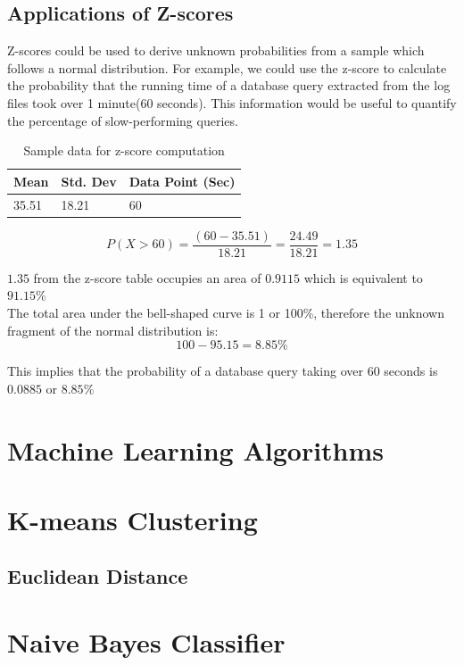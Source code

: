 \documentclass[12pt, letterpaper, titlepage]{report}
\begin{document}
\subsection{Applications of Z-scores}
Z-scores could be used to derive unknown probabilities from a sample which follows a normal distribution.
For example, we could use the z-score to calculate the probability that the running time of a database query extracted from the log files took over 1 minute(60 seconds). This information would be useful to quantify the percentage of slow-performing queries. \\
\begin{table}[h!]
	\centering
	
	
	\begin{tabular}{|l|l|l|}
		\hline
		\textbf{Mean} & \textbf{Std. Dev} & \textbf{Data Point (Sec)} \\ \hline
		35.51         & 18.21             & 60                        \\ \hline
	\end{tabular}
	\caption{Sample data for z-score computation}
	\label{sampleDataZscore}
\end{table}



$$
P(X>60) = \dfrac{(60-35.51)}{18.21}
        = \dfrac{24.49}{18.21} = 1.35
$$

$1.35$ from the z-score table occupies an area of $0.9115$ which is equivalent to $91.15\%$\\
The total area under the bell-shaped curve is 1 or 100\%, therefore the unknown fragment of the normal distribution is:\\
$$100 - 95.15 = 8.85\%$$

This implies that the probability of a database query taking over 60 seconds is $0.0885$ or $8.85\%$

\section{Machine Learning Algorithms}
\section{K-means Clustering}
\subsection{Euclidean Distance}
\section{Naive Bayes Classifier}
\end{document}
